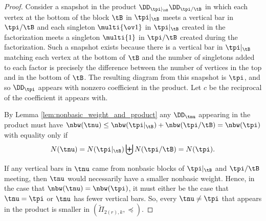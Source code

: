 \begin{proof}

    Consider a snapshot in the product $\DD_{\tpi|_{\tB}}\DD_{\tpi/\tB}$ in which each vertex at the bottom of the block $\tB$ in $\tpi|_{\tB}$ meets a vertical bar in $\tpi/\tB$ and each singleton $\multi{\ov1}$ in $\tpi|_{\tB}$ created in the factorization meets a singleton $\multi{1}$ in $\tpi/\tB$ created during the factorization. Such a snapshot exists because there is a vertical bar in $\tpi|_{\tB}$ matching each vertex at the bottom of $\tB$ and the number of singletons added to each factor is precisely the difference between the number of vertices in the top and in the bottom of $\tB$. The resulting diagram from this snapshot is $\tpi$, and so $\DD_\tpi$ appears with nonzero coefficient in the product. Let $c$ be the reciprocal of the coefficient it appears with.

    By Lemma \ref{lem:nonbasic_weight_and_product} any $\DD_\tnu$ appearing in the product must have $\nbw(\tnu)\leq\nbw(\tpi|_{\tB})+\nbw(\tpi/\tB)=\nbw(\tpi)$ with equality only if \[N(\tnu)=N(\tpi|_{\tB})\biguplus N(\tpi/\tB)=N(\tpi).\]

    If any vertical bars in $\tnu$ came from nonbasic blocks of $\tpi|_{\tB}$ and $\tpi/\tB$ meeting, then $\tnu$ would necessarily have a smaller nonbasic weight. Hence, in the case that $\nbw(\tnu)=\nbw(\tpi)$, it must either be the case that $\tnu=\tpi$ or $\tnu$ has fewer vertical bars. So, every $\tnu\neq\tpi$ that appears in the product is smaller in $(\tilde\Pi_{2(r),k},\preceq)$.
\end{proof}

